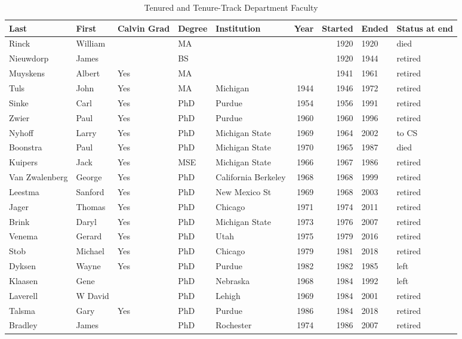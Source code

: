 \documentclass[
]{book}
\begin{document}
\begin{table}

\caption{\label{tab:faculty}Tenured and Tenure-Track Department Faculty}
\centering
\begin{tabular}[t]{lllllrrll}
\toprule
Last & First & Calvin Grad & Degree & Institution & Year & Started & Ended & Status at end\\
\midrule
Rinck & William &  & MA &  &  & 1920 & 1920 & died\\
Nieuwdorp & James &  & BS &  &  & 1920 & 1944 & retired\\
Muyskens & Albert & Yes & MA &  &  & 1941 & 1961 & retired\\
Tuls & John & Yes & MA & Michigan & 1944 & 1946 & 1972 & retired\\
Sinke & Carl & Yes & PhD & Purdue & 1954 & 1956 & 1991 & retired\\
\addlinespace
Zwier & Paul & Yes & PhD & Purdue & 1960 & 1960 & 1996 & retired\\
Nyhoff & Larry & Yes & PhD & Michigan State & 1969 & 1964 & 2002 & to CS\\
Boonstra & Paul & Yes & PhD & Michigan State & 1970 & 1965 & 1987 & died\\
Kuipers & Jack & Yes & MSE & Michigan State & 1966 & 1967 & 1986 & retired\\
Van Zwalenberg & George & Yes & PhD & California Berkeley & 1968 & 1968 & 1999 & retired\\
\addlinespace
Leestma & Sanford & Yes & PhD & New Mexico St & 1969 & 1968 & 2003 & retired\\
Jager & Thomas & Yes & PhD & Chicago & 1971 & 1974 & 2011 & retired\\
Brink & Daryl & Yes & PhD & Michigan State & 1973 & 1976 & 2007 & retired\\
Venema & Gerard & Yes & PhD & Utah & 1975 & 1979 & 2016 & retired\\
Stob & Michael & Yes & PhD & Chicago & 1979 & 1981 & 2018 & retired\\
\addlinespace
Dyksen & Wayne & Yes & PhD & Purdue & 1982 & 1982 & 1985 & left\\
Klaasen & Gene &  & PhD & Nebraska & 1968 & 1984 & 1992 & left\\
Laverell & W David &  & PhD & Lehigh & 1969 & 1984 & 2001 & retired\\
Talsma & Gary & Yes & PhD & Purdue & 1986 & 1984 & 2018 & retired\\
Bradley & James &  & PhD & Rochester & 1974 & 1986 & 2007 & retired\\

\end{tabular}
\end{table}
\end{document}
